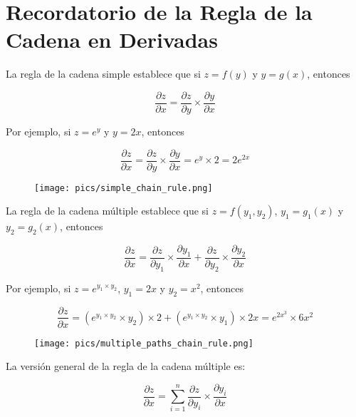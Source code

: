 \section{Recordatorio de la Regla de la Cadena en Derivadas}

La regla de la cadena simple establece que si $z = f(y)$ y $y = g(x)$, entonces

\begin{displaymath}
\frac{\partial z}{\partial x} = \frac{\partial z}{\partial y} \times \frac{\partial y}{\partial x}
\end{displaymath}

Por ejemplo, si $z= e^{y}$ y $y = 2x$, entonces

\begin{displaymath}
\frac{\partial z}{\partial x} = \frac{\partial z}{\partial y} \times \frac{\partial y}{\partial x} = e^{y} \times 2 = 2 e^{2x}
\end{displaymath}

\begin{figure}[htb]
	\centering
	 \texttt{[image: pics/simple\_chain\_rule.png]}
\end{figure}

La regla de la cadena múltiple establece que si $z = f(y_1,y_2)$, $y_1 = g_1(x)$ y $y_2 = g_2(x)$, entonces

\begin{displaymath}
\frac{\partial z}{\partial x} = \frac{\partial z}{\partial y_1} \times \frac{\partial y_1}{\partial x} + \frac{\partial z}{\partial y_2} \times \frac{\partial y_2}{\partial x}
\end{displaymath}

Por ejemplo, si $z= e^{y_1 \times y_2}$, $y_1 = 2x$ y $y_2 = x^2$, entonces

\begin{displaymath}
\frac{\partial z}{\partial x} = (e^{y_1 \times y_2}\times y_2) \times 2 + (e^{y_1 \times y_2}\times y_1) \times 2x = e^{2x^3} \times 6x^2
\end{displaymath}


\begin{figure}[htb]
	\centering
	 \texttt{[image: pics/multiple\_paths\_chain\_rule.png]}
\end{figure}

La versión general de la regla de la cadena múltiple es:

\begin{displaymath}
 \frac{\partial z}{\partial x} = \sum_{i=1}^n \frac{\partial z}{\partial y_i} \times \frac{\partial y_i}{\partial x}
\end{displaymath}

